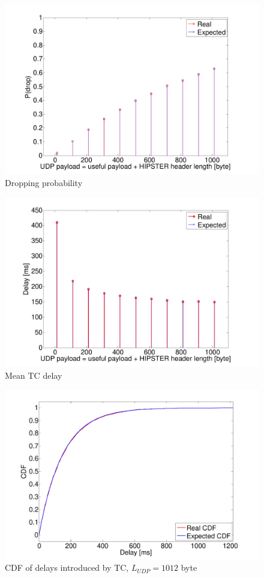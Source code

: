 \documentclass[10pt,twocolumn]{article}
\begin{document}
\begin{figure}[h!]
  \centering
  \includegraphics[width=0.95\columnwidth, keepaspectratio]{tex/images/pdrop.pdf}
  \caption{Dropping probability}
  \label{fig:pDrop}
\end{figure}

\begin{figure}[h!]
  \centering
  \includegraphics[width=0.95\columnwidth, keepaspectratio]{tex/images/delayChannel.pdf}
  \caption{Mean TC delay}
  \label{fig:delay}
\end{figure}

\begin{figure}[h!]
  \centering
  \includegraphics[width = 0.95\columnwidth, keepaspectratio]{tex/images/cdfChannel.pdf}
  \caption{CDF of delays introduced by TC, $L_{UDP} = 1012$ byte}
  \label{fig:CDF}
\end{figure}
\end{document}
